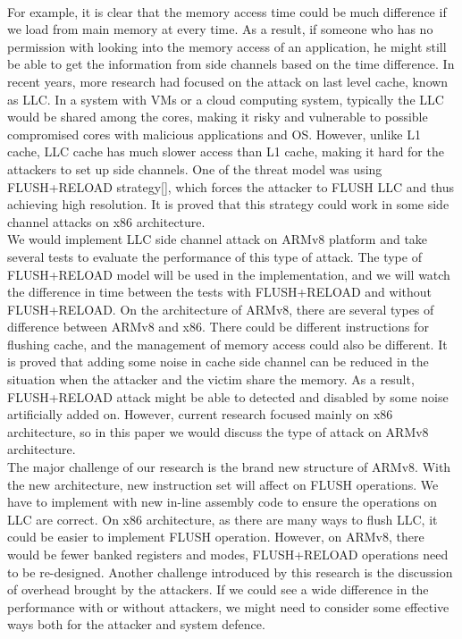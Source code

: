 \documentclass{sig-alternate}
\begin{document}
\\
\indent
For example, it is clear that the memory access time could be much difference if we load from main memory at every time. As a result, if someone who has no permission with looking into the memory access of an application, he might still be able to get the information from side channels based on the time difference. In recent years, more research had focused on the attack on last level cache, known as LLC. In a system with VMs or a cloud computing system, typically the LLC would be shared among the cores, making it risky and vulnerable to possible compromised cores with malicious applications and OS. However, unlike L1 cache, LLC cache has much slower access than L1 cache, making it hard for the attackers to set up side channels. One of the threat model was using FLUSH+RELOAD strategy[], which forces the attacker to FLUSH LLC and thus achieving high resolution. It is proved that this strategy could work in some side channel attacks on x86 architecture.
\\
\indent
We would implement LLC side channel attack on ARMv8 platform and take several tests to evaluate the performance of this type of attack. The type of FLUSH+RELOAD model will be used in the implementation, and we will watch the difference in time between the tests with FLUSH+RELOAD and without FLUSH+RELOAD. On the architecture of ARMv8, there are several types of difference between ARMv8 and x86. There could be different instructions for flushing cache, and the management of memory access could also be different. It is proved that adding some noise in cache side channel can be reduced in the situation when the attacker and the victim share the memory. As a result, FLUSH+RELOAD attack might be able to detected and disabled by some noise artificially added on. However, current research focused mainly on x86 architecture, so in this paper we would discuss the type of attack on ARMv8 architecture.
\\
\indent
The major challenge of our research is the brand new structure of ARMv8. With the new architecture, new instruction set will affect on FLUSH operations. We have to implement with new  in-line assembly code to ensure the operations on LLC are correct. On x86 architecture, as there are many ways to flush LLC, it could be easier to implement FLUSH operation. However, on ARMv8, there would be fewer banked registers and modes, FLUSH+RELOAD operations need to be re-designed. Another challenge introduced by this research is the discussion of overhead brought by the attackers. If we could see a wide difference in the performance with or without attackers, we might need to consider some effective ways both for the attacker and system defence.
\end{document}
